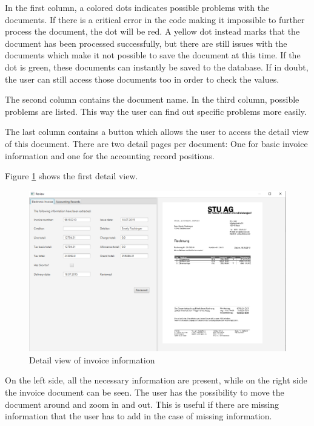 In the first column, a colored dots indicates possible problems with the documents. If there is a critical error in the code making it impossible to further process the document, the dot will be red. 
A yellow dot instead marks that the document has been processed successfully, but there are still issues with the documents which make it not possible to save the document at this time.
If the dot is green, these documents can instantly be saved to the database. If in doubt, the user can still access those documents too in order to check the values.

The second column contains the document name. In the third column, possible problems are listed. This way the user can find out specific problems more easily.

The last column contains a button which allows the user to access the detail view of this document. There are two detail pages per document: One for basic invoice information and one for the accounting record positions.

Figure \ref{reviewElectronicInvoice} shows the first detail view.

\begin{figure}[htb!]
\centering
\includegraphics[width=\textwidth,natwidth=396,natheight=247]{Images/GUI/reviewElectronicInvoice.pdf}
\caption{Detail view of invoice information \label{reviewElectronicInvoice}}
\end{figure}

On the left side, all the necessary information are present, while on the right side the invoice document can be seen. The user has the possibility to move the document around and zoom in and out. This is useful if there are missing information that the user has to add in the case of missing information.

